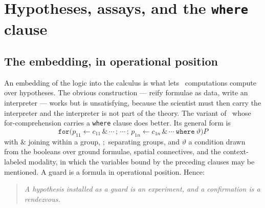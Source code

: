 \begin{table}[t]
\centering
{}
\caption{The three grades of access. The ladder is also an ordering by invasiveness
(\S\ref{sci:sec:exposure}), and in the opposite direction.}
\label{sci:tab:access}
\end{table}

\section{Hypotheses, assays, and the \texttt{where} clause}\label{sci:S4}
\label{sci:sec:assay}

\subsection{The embedding, in operational position}\label{sci:S4.1}

An embedding of the logic into the calculus is what lets \rhoc\ computations compute over hypotheses.
The obvious construction --- reify formulae as data, write an interpreter --- works but is
unsatisfying, because the scientist must then carry the interpreter and the interpreter is not part of
the theory. The variant of \rhoc\ whose for-comprehension carries a \texttt{where} clause
\cite[\S9]{Omnibus} does better. Its general form is
\[
\texttt{for}\big( p_{11} \leftarrow c_{11} \,\&\, \cdots \,;\, \cdots \,;\, p_{1n} \leftarrow c_{1n}
\,\&\, \cdots \ \texttt{where}\ \vartheta \big) P
\]
with $\&$ joining within a group, $;$ separating groups, and $\vartheta$ a condition drawn from the
booleans over ground formulae, spatial connectives, and the context-labeled modality, in which the
variables bound by the preceding clauses may be mentioned. A guard is a formula in operational
position. Hence:

\begin{quote}
\itshape A hypothesis installed as a guard is an experiment, and a confirmation is a rendezvous.
\end{quote}

